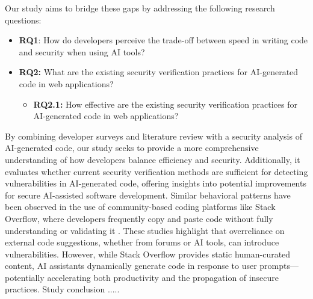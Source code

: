 Our study aims to bridge these gaps by addressing the following research questions:
\begin{itemize}
	\item \textbf{RQ1}: How do developers perceive the trade-off between speed in writing code and security when using AI tools?
	\item \textbf{RQ2:} What are the existing security verification practices for AI-generated code in web applications?
  	\begin{itemize}
    	\item \textbf{RQ2.1:} How effective are the existing security verification practices for AI-generated code in web applications?
  	\end{itemize}
\end{itemize}

By combining developer surveys and literature review with a security analysis of AI-generated code, our study seeks to provide a more comprehensive understanding of how developers balance efficiency and security. Additionally, it evaluates whether current security verification methods are sufficient for detecting vulnerabilities in AI-generated code, offering insights into potential improvements for secure AI-assisted software development.
Similar behavioral patterns have been observed in the use of community-based coding platforms like Stack Overflow, where developers frequently copy and paste code without fully understanding or validating it \cite{acar2016stackoverflow, yang2017code}. These studies highlight that overreliance on external code suggestions, whether from forums or AI tools, can introduce vulnerabilities. However, while Stack Overflow provides static human-curated content, AI assistants dynamically generate code in response to user prompts—potentially accelerating both productivity and the propagation of insecure practices.
Study conclusion .....